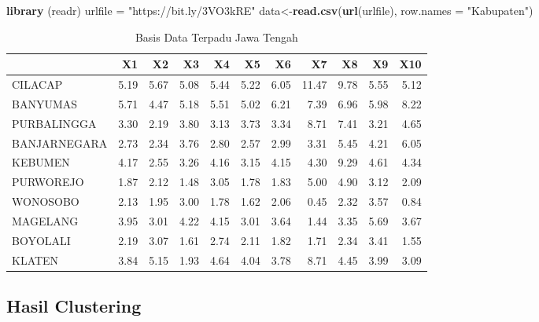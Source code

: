 \documentclass[
  oneside]{book}
\newenvironment{Shaded}{\begin{snugshade}}{\end{snugshade}}
\newcommand{\AttributeTok}[1]{\textcolor[rgb]{0.13,0.29,0.53}{#1}}
\newcommand{\FunctionTok}[1]{\textcolor[rgb]{0.13,0.29,0.53}{\textbf{#1}}}
\newcommand{\NormalTok}[1]{#1}
\newcommand{\OtherTok}[1]{\textcolor[rgb]{0.56,0.35,0.01}{#1}}
\newcommand{\StringTok}[1]{\textcolor[rgb]{0.31,0.60,0.02}{#1}}
\begin{document}
\begin{Shaded}
\begin{Highlighting}[]
\FunctionTok{library}\NormalTok{ (readr)}
\NormalTok{urlfile }\OtherTok{=} \StringTok{"https://bit.ly/3VO3kRE"}
\NormalTok{data}\OtherTok{\textless{}{-}}\FunctionTok{read.csv}\NormalTok{(}\FunctionTok{url}\NormalTok{(urlfile), }\AttributeTok{row.names =} \StringTok{"Kabupaten"}\NormalTok{)}
\end{Highlighting}
\end{Shaded}

\begin{table}

\caption{\label{tab:nice-tab-1}Basis Data Terpadu Jawa Tengah}
\centering
\begin{tabular}[t]{lrrrrrrrrrr}
\toprule
  & X1 & X2 & X3 & X4 & X5 & X6 & X7 & X8 & X9 & X10\\
\midrule
CILACAP & 5.19 & 5.67 & 5.08 & 5.44 & 5.22 & 6.05 & 11.47 & 9.78 & 5.55 & 5.12\\
BANYUMAS & 5.71 & 4.47 & 5.18 & 5.51 & 5.02 & 6.21 & 7.39 & 6.96 & 5.98 & 8.22\\
PURBALINGGA & 3.30 & 2.19 & 3.80 & 3.13 & 3.73 & 3.34 & 8.71 & 7.41 & 3.21 & 4.65\\
BANJARNEGARA & 2.73 & 2.34 & 3.76 & 2.80 & 2.57 & 2.99 & 3.31 & 5.45 & 4.21 & 6.05\\
KEBUMEN & 4.17 & 2.55 & 3.26 & 4.16 & 3.15 & 4.15 & 4.30 & 9.29 & 4.61 & 4.34\\
\addlinespace
PURWOREJO & 1.87 & 2.12 & 1.48 & 3.05 & 1.78 & 1.83 & 5.00 & 4.90 & 3.12 & 2.09\\
WONOSOBO & 2.13 & 1.95 & 3.00 & 1.78 & 1.62 & 2.06 & 0.45 & 2.32 & 3.57 & 0.84\\
MAGELANG & 3.95 & 3.01 & 4.22 & 4.15 & 3.01 & 3.64 & 1.44 & 3.35 & 5.69 & 3.67\\
BOYOLALI & 2.19 & 3.07 & 1.61 & 2.74 & 2.11 & 1.82 & 1.71 & 2.34 & 3.41 & 1.55\\
KLATEN & 3.84 & 5.15 & 1.93 & 4.64 & 4.04 & 3.78 & 8.71 & 4.45 & 3.99 & 3.09\\
\bottomrule
\end{tabular}
\end{table}

\subsection*{Hasil Clustering}\label{hasil-clustering}
\end{document}
